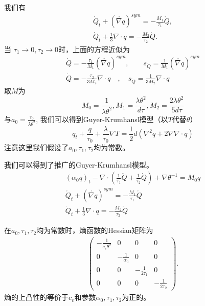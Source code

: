 \documentclass{article}
\begin{document}
我们有
\begin{eqnarray*}
\mathring{{Q}}_t+(\mathring{\nabla {q}})^{sym}=-\frac{M_1}{\tau_1}\mathring{{Q}}, \\
\dot{Q}_t+\frac{1}{3} \nabla \cdot {q}=-\frac{M_2}{\tau_2}\dot{Q}.
\end{eqnarray*}
当 $\tau_1 \to 0, \tau_2 \to 0$时，上面的方程近似为
\begin{eqnarray*} 
\mathring{{Q}}=-\frac{\tau_1}{M_1}(\mathring{\nabla {q}})^{sym} ,\quad  \quad s_{\mathring{Q}}=\frac{1}{M_1}(\mathring{\nabla {q}})^{sym} \\
\dot{Q}=-\frac{\tau_2}{3M_2}\nabla \cdot {q} \quad , \quad s_{\dot{Q}}=\frac{1}{3M_2} \nabla \cdot {q}
\end{eqnarray*}
取$M$为
\begin{equation}
M_0=\frac{1}{\lambda \theta^2}, M_1=\frac{\lambda \theta^2}{d\tau}, M_2=\frac{2\lambda \theta^2}{5d\tau}
\end{equation}
与$a_0=\frac{\tau_0}{\lambda \theta^2}$,
我们可以得到Guyer-Krumhansl模型（以$T$代替$\theta$）\cite{Jou1996extended}
\begin{equation}
{q}_t+\frac{{q}}{\tau_0}+\frac{\lambda}{\tau_0}\nabla T=\frac{1}{2}d(\nabla^2 {q}+2\nabla \nabla \cdot {q})
\end{equation}
注意这里我们假设了$a_0,\tau_1,\tau_2$均为常数。

我们可以得到了推广的Guyer-Krumhansl模型。
\begin{subequations}\label{eq:EGK}
	\begin{align}
(\alpha_0 {q})_t - \nabla \cdot ({\frac{1}{\tau_1} \mathring{{Q}}}+\frac{1}{\tau_2}\dot{Q})+\nabla \theta^{-1} = M_0 {q} \\
\mathring{{Q}}_t+(\mathring{\nabla {q}})^{sym}=-\frac{M_1}{\tau_1}\mathring{{Q}} \\
\dot{Q}_t+\frac{1}{3} \nabla \cdot {q}=-\frac{M_2}{\tau_2} \dot{Q}
	\end{align}
\end{subequations}

在$a_0,\tau_1,\tau_2$均为常数时，熵函数的Hessian矩阵为
\begin{eqnarray*}
\left(\begin{array}{llll}  -\frac{1}{c_v \theta^2} & 0 & 0 & 0 \\
                                           0  & -\frac{1}{\alpha_0} & 0 & 0 \\
										   0 & 0 & -\frac{1}{2\tau_1} & 0 \\
										   0 & 0 & 0 & -\frac{1}{2\tau_2}
										   \end{array} \right).
\end{eqnarray*}
熵的上凸性的等价于$c_v$和参数$\alpha_0,\tau_1,\tau_2$为正的。
\end{document}
